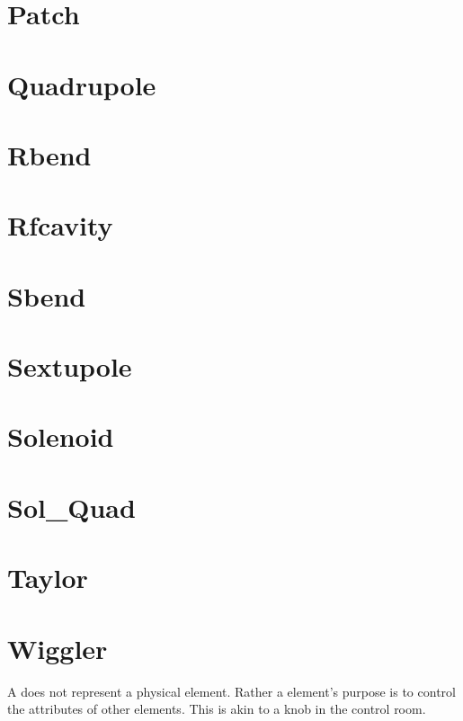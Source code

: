 \section{Patch}
\label{s:patch}

\section{Quadrupole}
\label{s:quad}

\section{Rbend}
\label{s:rbend}

\section{Rfcavity}
\label{s:rfcav}

\section{Sbend}
\label{s:sbend}

\section{Sextupole}
\label{s:sex}

\section{Solenoid}
\label{s:sol}

\section{Sol\_Quad}
\label{s:sq}

\section{Taylor}
\label{s:tay}

\section{Wiggler} 
\label{s:wig}

A  does not represent a physical element. Rather a
 element's purpose is to control the attributes of other elements.
This is akin to a knob in the control room.